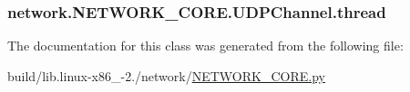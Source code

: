 \subsubsection[{thread}]{\setlength{\rightskip}{0pt plus 5cm}network.\+N\+E\+T\+W\+O\+R\+K\+\_\+\+C\+O\+R\+E.\+U\+D\+P\+Channel.\+thread}\label{classnetwork_1_1NETWORK__CORE_1_1UDPChannel_a8cead572d015248b58dafbcb0e7f4043}


The documentation for this class was generated from the following file\+:\begin{DoxyCompactItemize}
\item 
build/lib.\+linux-\/x86\+\_-\/2./network/\hyperlink{build_2lib_8linux-x86__64-2_87_2network_2NETWORK__CORE_8py}{N\+E\+T\+W\+O\+R\+K\+\_\+\+C\+O\+R\+E.\+py}\end{DoxyCompactItemize}
